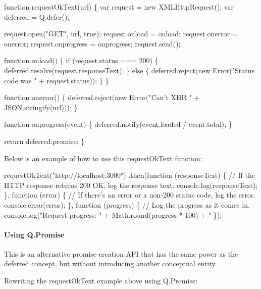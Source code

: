 \begin{DoxyCode}
function requestOkText(url) \{
    var request = new XMLHttpRequest();
    var deferred = Q.defer();

    request.open("GET", url, true);
    request.onload = onload;
    request.onerror = onerror;
    request.onprogress = onprogress;
    request.send();

    function onload() \{
        if (request.status === 200) \{
            deferred.resolve(request.responseText);
        \} else \{
            deferred.reject(new Error("Status code was " + request.status));
        \}
    \}

    function onerror() \{
        deferred.reject(new Error("Can't XHR " + JSON.stringify(url)));
    \}

    function onprogress(event) \{
        deferred.notify(event.loaded / event.total);
    \}

    return deferred.promise;
\}
\end{DoxyCode}


Below is an example of how to use this {\ttfamily request\+Ok\+Text} function\+:


\begin{DoxyCode}
requestOkText("http://localhost:3000")
.then(function (responseText) \{
    // If the HTTP response returns 200 OK, log the response text.
    console.log(responseText);
\}, function (error) \{
    // If there's an error or a non-200 status code, log the error.
    console.error(error);
\}, function (progress) \{
    // Log the progress as it comes in.
    console.log("Request progress: " + Math.round(progress * 100) + "%
\});
\end{DoxyCode}


\paragraph*{Using {\ttfamily Q.\+Promise}}

This is an alternative promise-\/creation A\+PI that has the same power as the deferred concept, but without introducing another conceptual entity.

Rewriting the {\ttfamily request\+Ok\+Text} example above using {\ttfamily Q.\+Promise}\+:


